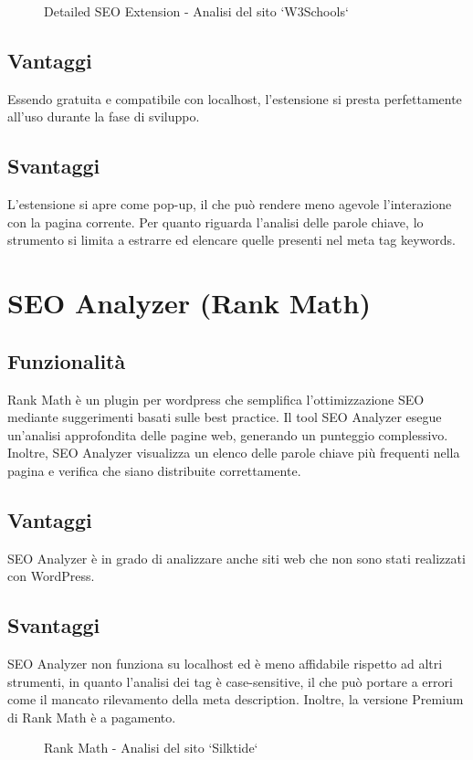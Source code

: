\begin{figure}[H]
    \centering 
    \caption{Detailed SEO Extension - Analisi del sito `W3Schools`}
\end{figure}

\subsection{Vantaggi}
\par Essendo gratuita e compatibile con \gls{localhost}, l'estensione si presta perfettamente all'uso durante la fase di sviluppo.

\subsection{Svantaggi}
\par L'estensione si apre come pop-up, il che può rendere meno agevole l'interazione con la pagina corrente. Per quanto riguarda l'analisi delle parole chiave, lo strumento si limita a estrarre ed elencare quelle presenti nel meta tag keywords.

\section{SEO Analyzer (Rank Math)}

\subsection{Funzionalità}
\par Rank Math è un plugin per \gls{wordpress} che semplifica l'ottimizzazione SEO mediante suggerimenti basati sulle best practice. Il tool SEO Analyzer esegue un'analisi approfondita delle pagine web, generando un punteggio complessivo. Inoltre, SEO Analyzer visualizza un elenco delle parole chiave più frequenti nella pagina e verifica che siano distribuite correttamente.

\subsection{Vantaggi}
\par SEO Analyzer è in grado di analizzare anche siti web che non sono stati realizzati con WordPress.

\subsection{Svantaggi}
\par SEO Analyzer non funziona su \gls{localhost} ed è meno affidabile rispetto ad altri strumenti, in quanto l'analisi dei tag è \gls{case-sensitive}, il che può portare a errori come il mancato rilevamento della meta description. Inoltre, la versione Premium di Rank Math è a pagamento.

\begin{figure}[H]
    \centering 
    \caption{Rank Math - Analisi del sito `Silktide`}
\end{figure}